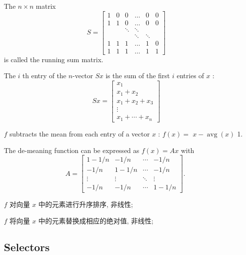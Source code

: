 \begin{example}
    The $ n \times n $ matrix
$$
S=\left[\begin{array}{cccccc}
1 & 0 & 0 & \ldots & 0 & 0 \\
1 & 1 & 0 & \ldots & 0 & 0 \\
& & \ddots & \ddots & & \\
& & & \ddots & \ddots & \\
1 & 1 & 1 & \ldots & 1 & 0 \\
1 & 1 & 1 & \ldots & 1 & 1
\end{array}\right]
$$
is called the running sum matrix. 

The $ i $ th entry of the $ n $-vector $ S x $ is the sum of the first $ i $ entries of $ x $ :
$$
S x=\left[\begin{array}{c}
x_{1} \\
x_{1}+x_{2} \\
x_{1}+x_{2}+x_{3} \\
\vdots \\
x_{1}+\cdots+x_{n}
\end{array}\right]
$$
\end{example}

\begin{example}
    $ f $ subtracts the mean from each entry of a vector $ x $ : $ f(x)= $ $ x-\operatorname{avg}(x) $ 1.

The de-meaning function can be expressed as $ f(x)=A x $ with
$$
A=\left[\begin{array}{cccc}
1-1 / n & -1 / n & \cdots & -1 / n \\
-1 / n & 1-1 / n & \cdots & -1 / n \\
\vdots & \vdots & \ddots & \vdots \\
-1 / n & -1 / n & \cdots & 1-1 / n
\end{array}\right] \text {. }
$$
\end{example}

\begin{example}
    $ f $ 对向量 $ x $ 中的元素进行升序排序, 非线性;
\end{example}

\begin{example}
    $ f $ 将向量 $ x $ 中的元素替换成相应的绝对值, 非线性;
\end{example}


\subsection{Selectors}



